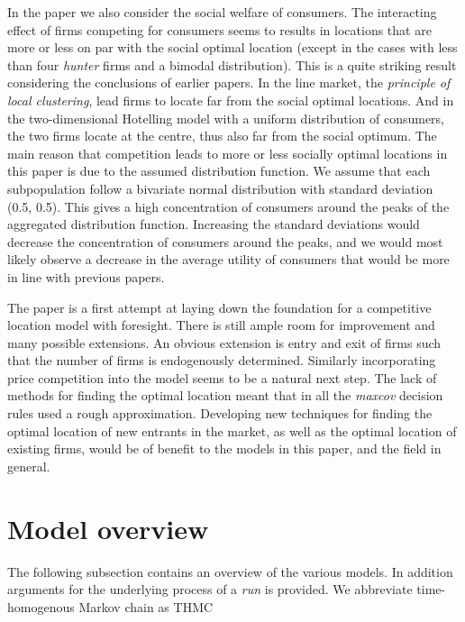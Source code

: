 \documentclass[preprint, 12pt]{elsarticle}
\begin{document}
In the paper we also consider the social welfare of consumers. The interacting effect of firms competing for consumers seems to results in locations that are more or less on par with the social optimal location (except in the cases with less than four \emph{hunter} firms and a bimodal distribution). This is a quite striking result considering the conclusions of earlier papers. In the line market, the \emph{principle of local clustering}, lead firms to locate far from the social optimal locations. And in the two-dimensional Hotelling model with a uniform distribution of consumers, the two firms locate at the centre, thus also far from the social optimum. The main reason that competition leads to more or less socially optimal locations in this paper is due to the assumed distribution function. We assume that each subpopulation follow a bivariate normal distribution with standard deviation (0.5, 0.5). This gives a high concentration of consumers around the peaks of the aggregated distribution function. Increasing the standard deviations would decrease the concentration of consumers around the peaks, and we would most likely observe a decrease in the average utility of consumers that would be more in line with previous papers. 

The paper is a first attempt at laying down the foundation for a competitive location model with foresight. There is still ample room for improvement and many possible extensions. An obvious extension is entry and exit of firms such that the number of firms is endogenously determined. Similarly incorporating price competition into the model seems to be a natural next step. The lack of methods for finding the optimal location meant that in all the \emph{maxcov} decision rules used a rough approximation. Developing new techniques for finding the optimal location of new entrants in the market, as well as the optimal location of existing firms, would be of benefit to the models in this paper, and the field in general.


\newpage
\begingroup
\appendix

\section{Model overview}
\label{app:overview}

The following subsection contains an overview of the various models. In addition arguments for the underlying process of a \emph{run} is provided. We abbreviate time-homogenous Markov chain as THMC
\end{document}
